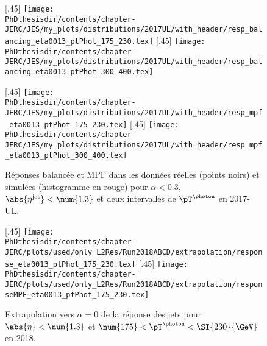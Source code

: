 \begin{figure}[p]
\centering
\subcaptionbox{Réponse balancée pour $\pT^{\photon}\in[175, 230[$ \SI{}{\GeV}.\label{subfig-distrib_Gjets_17UL_resp_balancing_eta0013_ptPhot_175_230}}[.45\textwidth]
{\texttt{[image: \\PhDthesisdir/contents/chapter-JERC/JES/my\_plots/distributions/2017UL/with\_header/resp\_balancing\_eta0013\_ptPhot\_175\_230.tex]}}
\hfill
\subcaptionbox{Réponse balancée pour $\pT^{\photon}\in[300, 400[$ \SI{}{\GeV}.\label{subfig-distrib_Gjets_17UL_resp_balancing_eta0013_ptPhot_300_400}}[.45\textwidth]
{\texttt{[image: \\PhDthesisdir/contents/chapter-JERC/JES/my\_plots/distributions/2017UL/with\_header/resp\_balancing\_eta0013\_ptPhot\_300\_400.tex]}}

\vspace{.5\baselineskip}

\subcaptionbox{Réponse MPF pour $\pT^{\photon}\in[175, 230[$ \SI{}{\GeV}.\label{subfig-distrib_Gjets_17UL_resp_mpf_eta0013_ptPhot_175_230}}[.45\textwidth]
{\texttt{[image: \\PhDthesisdir/contents/chapter-JERC/JES/my\_plots/distributions/2017UL/with\_header/resp\_mpf\_eta0013\_ptPhot\_175\_230.tex]}}
\hfill
\subcaptionbox{Réponse MPF pour $\pT^{\photon}\in[300, 400[$ \SI{}{\GeV}.\label{subfig-distrib_Gjets_17UL_resp_mpf_eta0013_ptPhot_300_400}}[.45\textwidth]
{\texttt{[image: \\PhDthesisdir/contents/chapter-JERC/JES/my\_plots/distributions/2017UL/with\_header/resp\_mpf\_eta0013\_ptPhot\_300\_400.tex]}}

\caption[Réponses balancée et MPF en 2017-UL.]{Réponses balancée et MPF dans les données réelles (points noirs) et simulées (histogramme en rouge) pour $\alpha<\num{0.3}$, $\abs{\eta^\text{jet}}<\num{1.3}$ et deux intervalles de $\pT^{\photon}$ en 2017-UL.}
\label{fig-distribs_Gjets_17UL_resp_bal_and_mpf}

\vspace{.5\baselineskip}

\centering
{}[.45\textwidth]
{\texttt{[image: \\PhDthesisdir/contents/chapter-JERC/plots/used/only\_L2Res/Run2018ABCD/extrapolation/response\_eta0013\_ptPhot\_175\_230.tex]}}
\hfill
{}[.45\textwidth]
{\texttt{[image: \\PhDthesisdir/contents/chapter-JERC/plots/used/only\_L2Res/Run2018ABCD/extrapolation/responseMPF\_eta0013\_ptPhot\_175\_230.tex]}}
\caption[Extrapolation vers $\alpha=0$ de la réponse des jets.]{Extrapolation vers $\alpha=0$ de la réponse des jets pour $\abs{\eta}<\num{1.3}$ et $\num{175}<\pT^{\photon}<\SI{230}{\GeV}$ en 2018.}
\label{fig-chapter-JERC-section-JES-subsec-analyse-responsebal_and_MPF_eta0013_ptPhot_175_230_extrap}
\end{figure}

